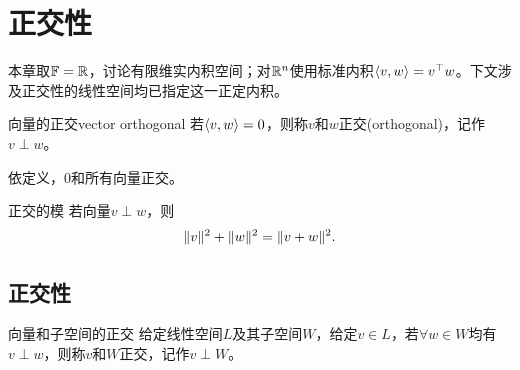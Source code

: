 \chapter{正交性}
本章取$\mathbb{F} = \mathbb{R}$，讨论有限维实内积空间；对$\mathbb{R}^n$使用标准内积$\langle v,w\rangle = v^\top w$。下文涉及正交性的线性空间均已指定这一正定内积。
\begin{definition}{向量的正交}{vector orthogonal}
	若$\langle v,w\rangle = 0$，则称$v$和$w$正交(orthogonal)，记作$v \perp w$。
\end{definition}
\begin{remark}
	依定义，0和所有向量正交。
\end{remark}
\begin{theorem}{正交的模}{}
	若向量$v \perp w$，则
	\begin{align}
		\lVert v\rVert^2 + \lVert w\rVert^2 = \lVert v + w\rVert^2.
	\end{align}
\end{theorem}

\section{正交性}

\begin{definition}
	{向量和子空间的正交}{}
	给定线性空间$L$及其子空间$W$，给定$v \in L$，若$\forall w \in W$均有$v \perp w$，则称$v$和$W$正交，记作$v \perp W$。
\end{definition}

